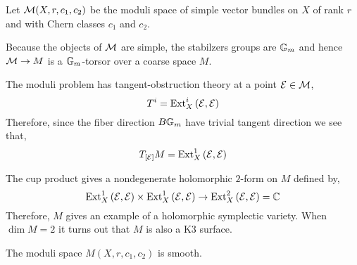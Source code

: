 \documentclass[12pt]{article}
\begin{document}
\begin{defn}
Let $\mathcal{M}(X, r, c_1, c_2)$ be the moduli space of simple vector bundles on $X$ of rank $r$ and with Chern classes $c_1$ and $c_2$. 
\end{defn}

\begin{rmk}
Because the objects of $\mathcal{M}$ are simple, the stabilzers groups are $\mathbb{G}_m$ and hence $\mathcal{M} \to M$ is a $\mathbb{G}_m$-torsor over a coarse space $M$. 
\end{rmk}

\begin{rmk}
The moduli problem has tangent-obstruction theory at a point $\mathcal{E} \in \mathcal{M}$,
\[ T^i = \mathrm{Ext}^{i}_{X} \left( \mathcal{E}, \mathcal{E} \right) \]
Therefore, since the fiber direction $B \mathbb{G}_m$ have trivial tangent direction we see that,
\[ T_{[\mathcal{E}]} M = \mathrm{Ext}^{1}_{X} \left( \mathcal{E}, \mathcal{E} \right) \]
\end{rmk}

\begin{rmk}
The cup product gives a nondegenerate holomorphic $2$-form on $M$ defined by,
\[ \mathrm{Ext}^{1}_{X} \left( \mathcal{E}, \mathcal{E} \right) \times \mathrm{Ext}^{1}_{X} \left( \mathcal{E}, \mathcal{E} \right) \to \mathrm{Ext}^{2}_{X} \left( \mathcal{E}, \mathcal{E} \right) = \mathbb{C} \]
Therefore, $M$ gives an example of a holomorphic symplectic variety. When $\dim{M} = 2$ it turns out that $M$ is also a K3 surface.
\end{rmk}

\begin{theorem}[Mukai]
The moduli space $M(X, r, c_1, c_2)$ is smooth.
\end{theorem}

\newcommand{\ob}{\mathrm{ob}}
\newcommand{\Def}{\mathrm{Def}}
\end{document}
